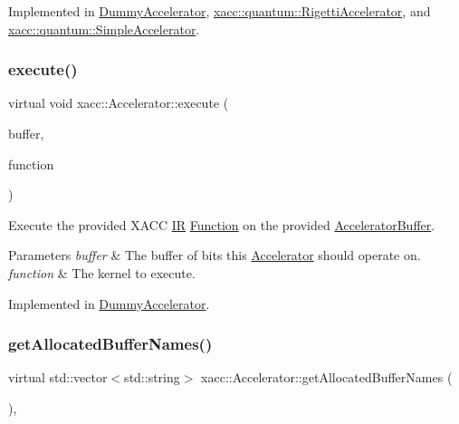 Implemented in \hyperlink{a01143_aa645e7ba6343aa9812836d1e141bd7c8}{Dummy\+Accelerator}, \hyperlink{a01083_a731551c94b1abef40d2cf032e8712df6}{xacc\+::quantum\+::\+Rigetti\+Accelerator}, and \hyperlink{a01111_adb9393692e9f484df241aa5d014030d1}{xacc\+::quantum\+::\+Simple\+Accelerator}.

\mbox{\label{a01435_a89b3f3e6294f228abf03a410b0fb1674}} 
\subsubsection{\texorpdfstring{execute()}{execute()}}
{\footnotesize\ttfamily virtual void xacc\+::\+Accelerator\+::execute (\begin{DoxyParamCaption}\item[{std\+::shared\+\_\+ptr$<$ \hyperlink{a01447}{Accelerator\+Buffer} $>$}]{buffer,  }\item[{const std\+::shared\+\_\+ptr$<$ \hyperlink{a01475}{Function} $>$}]{function }\end{DoxyParamCaption})\hspace{0.3cm}{\ttfamily [pure virtual]}}

Execute the provided X\+A\+CC \hyperlink{a01499}{IR} \hyperlink{a01475}{Function} on the provided \hyperlink{a01447}{Accelerator\+Buffer}.


\begin{DoxyParams}{Parameters}
{\em buffer} & The buffer of bits this \hyperlink{a01435}{Accelerator} should operate on. \\
\hline
{\em function} & The kernel to execute. \\
\hline
\end{DoxyParams}


Implemented in \hyperlink{a01143_a389ba22af5d0d964f5d5367f01712b3c}{Dummy\+Accelerator}.

\mbox{\label{a01435_ae1463d7e405df89fa4af47e8922f4b82}} 
\subsubsection{\texorpdfstring{get\+Allocated\+Buffer\+Names()}{getAllocatedBufferNames()}}
{\footnotesize\ttfamily virtual std\+::vector$<$std\+::string$>$ xacc\+::\+Accelerator\+::get\+Allocated\+Buffer\+Names (\begin{DoxyParamCaption}{ }\end{DoxyParamCaption})\hspace{0.3cm}{\ttfamily [inline]}, {\ttfamily [virtual]}}

